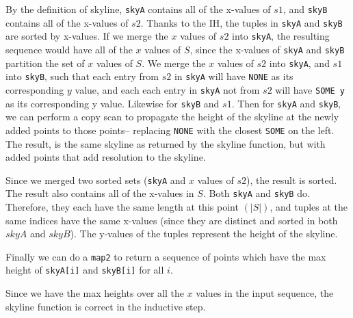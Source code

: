 \documentclass[11pt,letterpaper]{article}
\begin{document}
By the definition of skyline, \texttt{skyA} contains all of the x-values of $s1$,
and \texttt{skyB} contains all of the x-values of $s2$. Thanks to the IH,
the tuples in \texttt{skyA} and \texttt{skyB} are sorted by x-values. If we merge
the $x$ values of $s2$ into \texttt{skyA}, the resulting sequence would have all of 
the $x$ values of $S$, since the x-values of \texttt{skyA} and \texttt{skyB} partition the
set of $x$ values of $S$. We merge the $x$ values of $s2$ into \texttt{skyA}, and
$s1$ into \texttt{skyB}, such that each entry from $s2$ in \texttt{skyA} will have \texttt{NONE} as its
corresponding $y$ value, and each each entry in \texttt{skyA} not from $s2$ will have \texttt{SOME y}
as its corresponding y value. Likewise for \texttt{skyB} and $s1$.
Then for \texttt{skyA} and \texttt{skyB},
we can perform a copy scan to propagate the height of the skyline at the newly
added points to those points-- replacing \texttt{NONE} with the closest \texttt{SOME} on the left.
The result, is the same skyline as returned by the skyline function, but with
added points that add resolution to the skyline.

Since we merged two sorted sets (\texttt{skyA} and $x$ values of $s2$), the result is sorted.
The result also contains all of the x-values in $S$. Both \texttt{skyA} and \texttt{skyB} do. Therefore,
they each have the same length at this point $(|S|)$, and tuples at the same indices
have the same x-values (since they are distinct and sorted in both $skyA$ and $skyB$).
The y-values of the tuples represent the height of the skyline.

Finally we can do a \texttt{map2}
to return a sequence of points which have the max height of \texttt{skyA[i]} and \texttt{skyB[i]}
for all $i$.

Since we have the max heights over all the $x$ values in the input sequence,
the skyline function is correct in the inductive step. 
\end{document}
